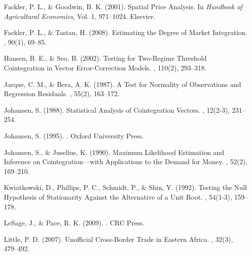\begin{thebibliography}{99}
Fackler, P. L., \& Goodwin, B. K. (2001).
\newblock Spatial Price Analysis.
\newblock In {\em Handbook of Agricultural Economics}, Vol. 1, 971--1024.
\newblock Elsevier.

Fackler, P. L., \& Tastan, H. (2008).
\newblock Estimating the Degree of Market Integration.
, 90(1), 69--85.

Hansen, B. E., \& Seo, B. (2002).
\newblock Testing for Two-Regime Threshold Cointegration in Vector Error-Correction Models.
, 110(2), 293--318.

Jarque, C. M., \& Bera, A. K. (1987).
\newblock A Test for Normality of Observations and Regression Residuals.
, 55(2), 163--172.

Johansen, S. (1988).
\newblock Statistical Analysis of Cointegration Vectors.
, 12(2-3), 231--254.

Johansen, S. (1995).
.
\newblock Oxford University Press.

Johansen, S., \& Juselius, K. (1990).
\newblock Maximum Likelihood Estimation and Inference on Cointegration---with Applications to the Demand for Money.
, 52(2), 169--210.

Kwiatkowski, D., Phillips, P. C., Schmidt, P., \& Shin, Y. (1992).
\newblock Testing the Null Hypothesis of Stationarity Against the Alternative of a Unit Root.
, 54(1-3), 159--178.

LeSage, J., \& Pace, R. K. (2009).
.
\newblock CRC Press.

Little, P. D. (2007).
\newblock Unofficial Cross-Border Trade in Eastern Africa.
, 32(3), 479--492.


\end{thebibliography}
